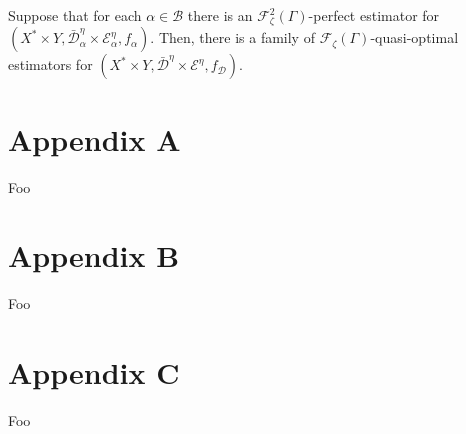 \documentclass[a4paper]{article}
\newcommand{\Dist}{\mathcal{D}}
\newcommand{\Fall}{\mathcal{F}}
\newcommand{\Base}{\mathcal{B}}
\begin{document}
Suppose that for each ${\alpha \in \Base}$ there is an ${\Fall_\zeta^2(\Gamma)}$-perfect estimator for ${(X^* \times Y, \bar{\Dist}_\alpha^\eta \times \mathcal{E}_\alpha^\eta,f_\alpha)}$. Then, there is a family of ${\Fall_\zeta(\Gamma)}$-quasi-optimal estimators for ${(X^* \times Y, \bar{\Dist}^\eta \times \mathcal{E}^\eta,f_\Dist)}$.

\section{Appendix A}

Foo

\section{Appendix B}

Foo

\section{Appendix C}

Foo
\end{document}
